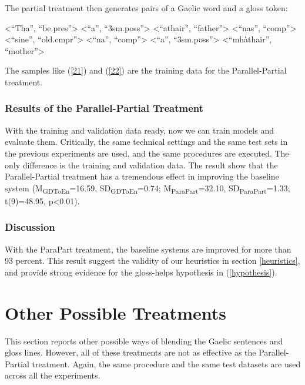 \documentclass[11pt,a4paper]{article}
\begin{document}
The partial treatment then generates pairs of a Gaelic word and a gloss token: 
\begin{exe}
	\ex\label{22}
	\begin{xlist}
		\ex <``Tha'', ``be.pres''>
		\ex <``a'', ``3sm.poss''>
		\ex <``athair'', ``father''>
		\ex <``nas'', ``comp''>
		\ex <``sine'', ``old.cmpr''>
		\ex <``na'', ``comp''>
		\ex <``a'', ``3sm.poss''>
		\ex <``mh\`athair'', ``mother''>
	\end{xlist}
\end{exe}

The samples like (\ref{21}) and (\ref{22}) are the training data for the Parallel-Partial treatment. 

\subsubsection{Results of the Parallel-Partial Treatment}
With the training and validation data ready, now we can train models and evaluate them. Critically, the same technical settings and the same test sets in the previous experiments are used, and the same procedures are executed. 
The only difference is the training and validation data. The result show that the Parallel-Partial treatment has a tremendous effect in improving the baseline system (M\textsubscript{GDToEn}=16.59, SD\textsubscript{GDToEn}=0.74; M\textsubscript{ParaPart}=32.10, SD\textsubscript{ParaPart}=1.33; t(9)=48.95, p<0.01). 

\subsubsection{Discussion}
With the ParaPart treatment, the baseline systems are improved for more than 93 percent. This result suggest the validity of our heuristics in section \ref{heuristics}, and provide strong evidence for the gloss-helps hypothesis in (\ref{hypothesis}).      





\section{Other Possible Treatments}
This section reports other possible ways of blending the Gaelic sentences and gloss lines. However, all of these treatments are not as effective as the Parallel-Partial treatment. Again, the same procedure and the same test datasets are used across all the experiments.    
\end{document}
